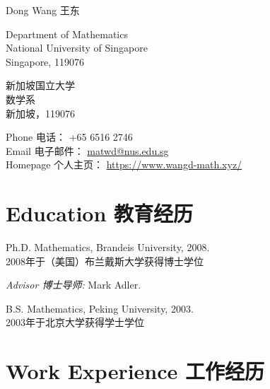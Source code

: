\documentclass[12pt,a4paper]{article}
\def\name{Dong Wang 王东}
\newenvironment{item_list}{
 \begin{list}{}{
   \setlength{\leftmargin}{1.5em}
   \setlength{\itemsep}{0.25em}
   \setlength{\parskip}{0pt}
   \setlength{\parsep}{0.25em}
 }
}{
 \end{list}
}
\begin{document}
{\huge \name}


\bigskip

\begin{minipage}[t]{0.5\textwidth}
  Department of Mathematics \\
  National University of Singapore \\
  Singapore, 119076 \\
\end{minipage}
\begin{minipage}[t]{0.5\textwidth}
  新加坡国立大学 \\
  数学系 \\
  新加坡，119076 \\
\end{minipage}
Phone 电话： +65 6516 2746 \\
Email 电子邮件： \href{mailto:matwd@nus.edu.sg}{matwd@nus.edu.sg} \\
Homepage 个人主页： \href{https://www.wangd-math.xyz/}{{https://www.wangd-math.xyz/}}

\section*{Education 教育经历}

\begin{item_list}
\item Ph.D. Mathematics, Brandeis University, 2008. \\
  2008年于（美国）布兰戴斯大学获得博士学位
    \begin{item_list}
    \item \textit{Advisor 博士导师:}
      Mark Adler.
    \end{item_list}
  \item B.S. Mathematics, %
    Peking University, 2003. \\
    2003年于北京大学获得学士学位
\end{item_list}

\section*{Work Experience 工作经历}
\end{document}
